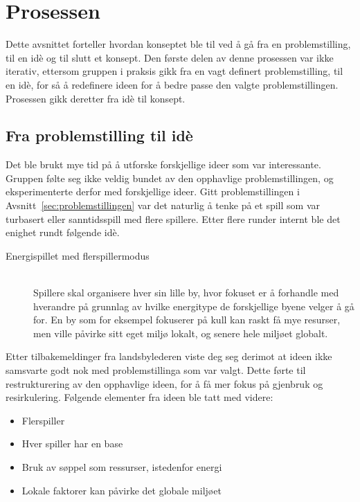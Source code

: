 \section{Prosessen}
Dette avsnittet forteller hvordan konseptet ble til ved å gå fra en
problemstilling, til en idè og til slutt et konsept. Den første delen av
denne prosessen var ikke iterativ, ettersom gruppen i praksis gikk fra
en vagt definert problemstilling, til en idè, for så å redefinere ideen
for å bedre passe den valgte problemstillingen. Prosessen gikk deretter
fra idè til konsept.
\subsection{Fra problemstilling til idè}
Det ble brukt mye tid på å utforske forskjellige ideer som var
interessante. Gruppen følte seg ikke veldig bundet av den opphavlige
problemstillingen, og eksperimenterte derfor med forskjellige ideer.
Gitt problemstillingen i Avsnitt~\ref{sec:problemstillingen} var det
naturlig å tenke på et spill som var turbasert eller sanntidsspill med
flere spillere. Etter flere runder internt ble det enighet rundt
følgende idè.
\begin{description}
\item[Energispillet med flerspillermodus] \hfill\\
Spillere skal organisere hver sin lille by, hvor fokuset er å forhandle
med hverandre på grunnlag av hvilke energitype de forskjellige byene
velger å gå for. En by som for eksempel fokuserer på kull kan raskt få
mye resurser, men ville påvirke sitt eget miljø lokalt, og senere hele
miljøet globalt.
\end{description}
Etter tilbakemeldinger fra landsbylederen viste deg seg derimot at ideen
ikke samsvarte godt nok med problemstillinga som var valgt. Dette førte
til restrukturering av den opphavlige ideen, for å få mer fokus på
gjenbruk og resirkulering. Følgende elementer fra ideen ble tatt med
videre:
\begin{itemize}
	\item Flerspiller
	\item Hver spiller har en base
	\item Bruk av søppel som ressurser, istedenfor energi
	\item Lokale faktorer kan påvirke det globale miljøet
\end{itemize}
